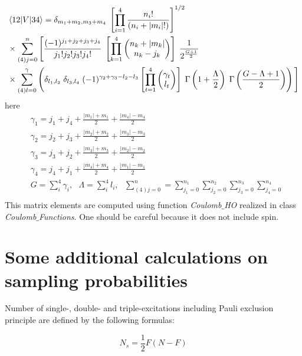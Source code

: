 \documentclass[twoside,english]{uiofysmaster}
\theoremstyle{definition}
\begin{document}
\begin{align}
& \braket{12|V|34}= \delta_{m_1+m_2,m_3+m_4} \;  \left[ \prod_{i=1}^4 \frac{n_i !}{(n_i+|m_i|!)} \right]^{1/2}  \nonumber \\
&\times \sum_{(4)j=0}^{n} \Bigg[ \frac{(-1)^{j_1+j_2+j_3+j_4}} {j_1!j_2!j_3!j_4!} \; \left[ \prod_{k=1}^4 \begin{pmatrix} n_k+|m_k|\\n_k-j_k\end{pmatrix}  \right]  \; \frac{1}{2^{\frac{G+1}{2}}} \nonumber  \\
&\times \sum_{(4)l=0}^{\gamma}\left( \delta_{l_1,l_2} \; \delta_{l_3,l_4} \; (-1)^{\gamma_2+\gamma_3-l_2-l_3} \left[ \prod_{t=1}^4 \begin{pmatrix} \gamma_t\\l_t\end{pmatrix} \right] \; \Gamma \left(1+\frac{\Lambda}{2} \right) \; \Gamma \left(\frac{G - \Lambda +1}{2}\right)    \right)  \Bigg]
\end{align} 
here
\begin{align*}
&\gamma_1=j_1+j_4+\frac{|m_1|+m_1}{2}+\frac{|m_4|-m_4}{2} \\
&\gamma_2=j_2+j_3+\frac{|m_2|+m_2}{2}+\frac{|m_3|-m_3}{2} \\
&\gamma_3=j_3+j_2+\frac{|m_3|+m_3}{2}+\frac{|m_2|-m_2}{2} \\
&\gamma_4=j_4+j_1+\frac{|m_4|+m_4}{2}+\frac{|m_1|-m_1}{2} \\
&G=\sum_{i}^4 \gamma_i, \text{   }  \Lambda = \sum_{i}^4 l_i, \text{   } \sum_{(4)j=0}^{n}=\sum_{j_1=0}^{n_1}\sum_{j_2=0}^{n_2}\sum_{j_3=0}^{n_3}\sum_{j_4=0}^{n_4}\\
\end{align*}
This matrix elements are computed using function \textit{Coulomb$\_$HO} realized in class \textit{Coulomb$\_$Functions}. One should be careful because it does not include spin.



\chapter{Some additional calculations on sampling probabilities}\label{app:3}

Number of single-, double- and triple-excitations including Pauli exclusion principle are defined by the following formulas:

\begin{equation}\label{eq:num_singles}
N_s = \frac{1}{2}F(N-F)
\end{equation}
\end{document}
